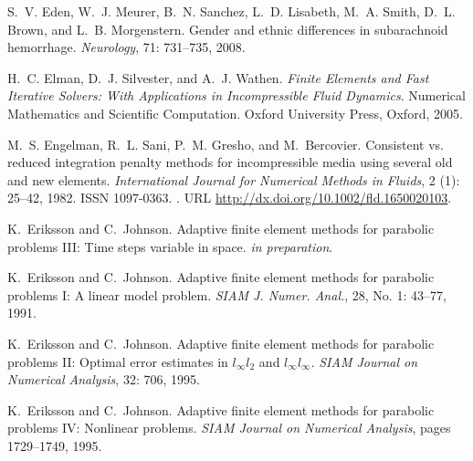 \begin{thebibliography}{467}
S.~V. Eden, W.~J. Meurer, B.~N. Sanchez, L.~D. Lisabeth, M.~A. Smith, D.~L.
  Brown, and L.~B. Morgenstern.
\newblock Gender and ethnic differences in subarachnoid hemorrhage.
\newblock \emph{Neurology}, 71: 731--735, 2008.

H.~C. Elman, D.~J. Silvester, and A.~J. Wathen.
\newblock \emph{Finite Elements and Fast Iterative Solvers: With Applications
  in Incompressible Fluid Dynamics}.
\newblock Numerical Mathematics and Scientific Computation. Oxford University
  Press, Oxford, 2005.

M.~S. Engelman, R.~L. Sani, P.~M. Gresho, and M.~Bercovier.
\newblock Consistent vs. reduced integration penalty methods for incompressible
  media using several old and new elements.
\newblock \emph{International Journal for Numerical Methods in Fluids},
  2 (1): 25--42, 1982.
\newblock ISSN 1097-0363.
\newblock {}.
\newblock URL \url{http://dx.doi.org/10.1002/fld.1650020103}.

K.~Eriksson and C.~Johnson.
\newblock Adaptive finite element methods for parabolic problems {III}: {T}ime
  steps variable in space.
\newblock \emph{in preparation}.

K.~Eriksson and C.~Johnson.
\newblock Adaptive finite element methods for parabolic problems {I}: {A}
  linear model problem.
\newblock \emph{SIAM J. Numer. Anal.}, 28, No. 1: 43--77, 1991.

K.~Eriksson and C.~Johnson.
\newblock Adaptive finite element methods for parabolic problems {II}: Optimal
  error estimates in $l_\infty l_2$ and $l_\infty l_\infty$.
\newblock \emph{SIAM Journal on Numerical Analysis}, 32: 706,
  1995{}.

K.~Eriksson and C.~Johnson.
\newblock Adaptive finite element methods for parabolic problems {IV}:
  Nonlinear problems.
\newblock \emph{SIAM Journal on Numerical Analysis}, pages 1729--1749,
  1995{}.


\end{thebibliography}
